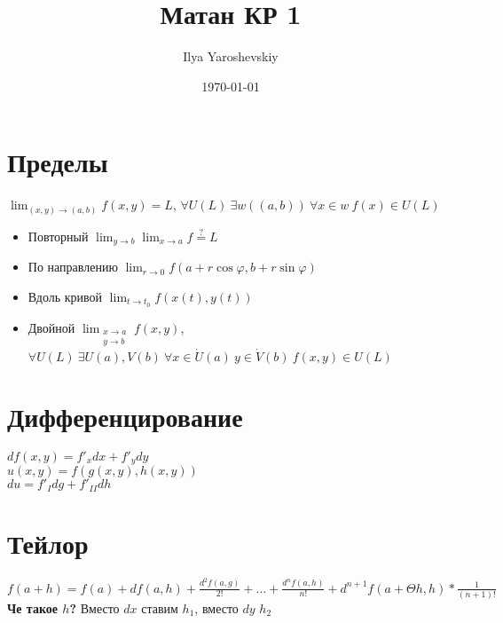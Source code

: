\documentclass{article}
\author{Ilya Yaroshevskiy}
\date{\today}
\title{Матан КР 1}
\begin{document}
\maketitle
\tableofcontents


\section{Пределы}
\label{sec:org0e850b7}
\(\displaystyle{\lim_{(x, y) \to (a, b)}f(x, y)} = L\), \(\forall U(L)\ \exists w((a, b))\ \forall x \in w\ f(x) \in U(L)\) \\
\begin{itemize}
\item Повторный \(\displaystyle{\lim_{y \to b}\lim_{x \to a}f \overset{?}{=} L}\)
\item По направлению \(\displaystyle{\lim_{r \to 0}f(a + r\cos\varphi, b + r\sin\varphi)}\)
\item Вдоль кривой \(\displaystyle{\lim_{t \to t_0}}f(x(t), y(t))\)
\item Двойной \(\displaystyle{{\lim_\substack{x \to a \\ y \to b}}}f(x,y)\), \(\forall U(L)\ \exists U(a), V(b)\ \forall x \in \dot{U}(a)\ y \in \dot{V}(b)\ f(x, y) \in U(L)\)
\end{itemize}
\section{Дифференцирование}
\label{sec:orgfb36047}
\(df(x, y) = f'_xdx + f'_ydy\) \\
\(u(x, y) = f(g(x, y), h(x, y))\) \\
\(du = f'_Idg + f'_{II}dh\)
\section{Тейлор}
\label{sec:org827773c}
\(f(a + h) = f(a) + df(a, h) + \frac{d^2f(a, g)}{2!} + \dots + \frac{d^nf(a, h)}{n!} + d^{n + 1}f(a + \Theta h, h) * \frac{1}{(n + 1)!}\) \\
\textbf{Че такое \(h\)?} Вместо \(dx\) ставим \(h_1\), вместо \(dy\) \(h_2\)
\end{document}
